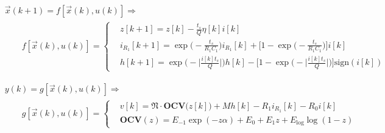 \documentclass[11pt,a4paper,oneside]{book}
\numberwithin{equation}{section}
\newcommand{\abs}[1]{\big|#1\big|}
\newcommand{\sign}{\text{sign}}
\theoremstyle{it}
\theoremstyle{definition}
\begin{document}
\begin{equation}
	\begin{aligned}\label{lithium_ion_battery_ctrl_problem_eq_4c}
		&\vec{x}(k+1)=f[\vec{x}(k),u(k)] \Rightarrow  \\[6pt]
		& \qquad f[\vec{x}(k),u(k)]=
		\left\lbrace \begin{aligned}
			&	z[k+1] =z[k] -\frac{t_s}{Q}\eta[k]i[k] \\[6pt]
			&	i_{R_1}[k+1] = \exp\Big(-\frac{t_s}{R_1C_1}\Big)i_{R_1}[k]+\Big[1-\exp\Big(-\frac{t_s}{R_1C_1}\Big)\Big]i[k] \\[6pt]
			&	h[k+1] = \exp\Bigg(-\abs{\frac{i[k] t_s}{Q}}\Bigg)h[k] - \Bigg[1-\exp\Bigg(-\abs{\frac{i[k] t_s}{Q}}\Bigg)\Bigg]\sign(i[k])
		\end{aligned}\right.
	\end{aligned}
\end{equation}

\begin{equation}\label{lithium_ion_battery_ctrl_problem_eq_4d}
	\begin{aligned}
		&y(k)=g[\vec{x}(k),u(k)] \Rightarrow \\[6pt]
		& \qquad g[\vec{x}(k),u(k)]=
		\left\lbrace \begin{aligned}
			& v[k] = \mathfrak{N}\cdot\mathbf{OCV}\Big(z[k]\Big) +Mh[k]-R_1i_{R_1}[k] - R_0i[k] \\[6pt]
			& \mathbf{OCV}(z) = E_{-1}\exp(-z\alpha) + E_0 + E_1z +  E_\text{log}\log({1-z})
		\end{aligned}\right.
	\end{aligned}
\end{equation}
\end{document}
